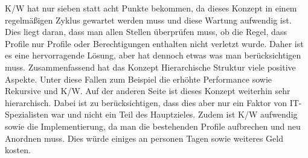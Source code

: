 \ac{K/W} hat nur sieben statt acht Punkte bekommen, da dieses Konzept in einem regelmäßigen Zyklus gewartet werden muss und diese Wartung aufwendig ist.
Dies liegt daran, dass man allen Stellen überprüfen muss, ob die Regel, dass Profile nur Profile oder Berechtigungen enthalten nicht verletzt wurde.
Daher ist es eine hervorragende Lösung, aber hat dennoch etwas was man berücksichtigen muss.
\newline
\newline
Zusammenfassend hat das Konzept Hierarchische Struktur viele positive Aspekte.
Unter diese Fallen zum Beispiel die erhöhte Performance sowie Rekursive und \ac{K/W}.
Auf der anderen Seite ist dieses Konzept weiterhin sehr hierarchisch.
Dabei ist zu berücksichtigen, dass dies aber nur ein Faktor von IT-Spezialisten war und nicht ein Teil des Hauptzieles.
Zudem ist \ac{K/W} aufwendig sowie die Implementierung, da man die bestehenden Profile aufbrechen und neu Anordnen muss.
Dies würde einiges an personen Tagen sowie weiteres Geld kosten.

